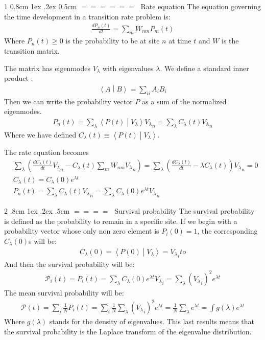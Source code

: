\documentclass[onecolumn,fleqn,notitlepage,secnumarabic]{revtex4}
\makeatletter
\newcommand{\inner}[2]{\left \langle #1 \middle| #2\right\rangle} %
\def\section{%
  \@startsection
    {section}%
    {1}%
    {\z@}%
    {0.8cm \@plus1ex \@minus .2ex}%
    {0.5cm}%
    {\Large\bf $=\!=\!=\!=\!=\!=\;$}%
}%
\def\subsection{%
  \@startsection
    {subsection}%
    {2}%
    {\z@}%
    {.8cm \@plus1ex \@minus .2ex}%
    {.5cm}%
    {\normalfont\small\bfseries$=\!=\!=\!=\;$}%
}%
\makeatother
\begin{document}
\section{Rate equation}
The equation governing the time development in a transition rate problem is:
\begin{align}
\frac{dP_n(t)}{dt} = \sum_m W_{nm}P_m(t)
\end{align}
Where $P_n(t) \ge 0$ is the probability to be at site $n$ at time $t$ and $W$ is the transition matrix.

The matrix has eigenmodes $V_\lambda$ with eigenvalues $\lambda$. 
We define a standard inner product :
\begin{align}
\inner{A}{B} = \sum_{ii} A_iB_i
\end{align}
Then we can write the probability vector $P$ as a sum of the normalized eigenmodes.
\begin{align}
P_n(t) = \sum_\lambda \inner{P(t)}{V_\lambda}{V_\lambda }_n = \sum_\lambda C_\lambda(t) {V_\lambda}_n
\end{align}
Where we have defined $C_\lambda(t)\equiv \inner{P(t)}{V_\lambda}$.


The rate equation becomes
\begin{align}
&\sum_\lambda \left( \frac{dC_\lambda(t)}{dt}{V_\lambda}_n - C_\lambda(t)\sum_m W_{nm}{V_\lambda}_n \right)= \sum_\lambda \left( \frac{dC_\lambda(t)}{dt} - \lambda C_\lambda(t)\right){V_\lambda}_n =0\\
&C_\lambda(t) = C_\lambda(0)e^{\lambda t}\\
&P_n(t) = \sum_\lambda C_\lambda(t) {V_\lambda}_n = \sum_\lambda  C_\lambda(0)e^{\lambda t} {V_\lambda}_n 
\end{align}
\subsection{Survival probability}
The survival probability is defined as the probability to remain in a specific site. If we begin with a probability vector whose only non zero element is $P_i(0)=1$, the corresponding $C_\lambda(0)$s will be:
\begin{align}
C_\lambda(0) = \inner{P(0)}{V_\lambda}= {V_\lambda}_ito
\end{align}
And then the survival probability will be:
\begin{align}
\mathcal{P}_i(t) = P_i(t) = \sum_\lambda  C_\lambda(0)e^{\lambda t} {V_\lambda}_i=\sum_\lambda ({V_\lambda}_i)^2 e^{\lambda t} 
\end{align}
The mean survival probability will be:
\begin{align} \label{eq:surv_eigenvalues}
\mathcal{P}(t) = \sum_i \frac{1}{N} P_i(t)=\sum_i \frac{1}{N} \sum_\lambda ({V_\lambda}_i)^2 e^{\lambda t}  =\frac{1}{N}\sum_\lambda e^{\lambda t} = \int g(\lambda) e^{\lambda t}
\end{align}
Where $g(\lambda)$ stands for the density of eigenvalues. This last results means that the survival probability is the Laplace transform of the eigenvalue distribution.
\end{document}
